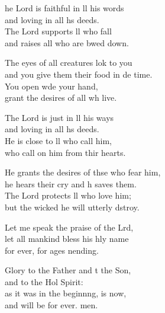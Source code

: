 \settowidth{\versewidth}{He grants the desires of those who fear him, *}
\begin{psalmverse}%
  \begin{patverse}
he Lord is faithful in ll his words\Med\\
and loving in all h\pointup{\i}s deeds.\\
The Lord supports ll who fall\Med\\
and raises all who are bwed down.

The eyes of all creatures lok to you\Med\\
and you give them their food in de time.\\
You open w\pointup{\i}de your hand,\Med\\
grant the desires of all wh live.

The Lord is just in ll his ways\Med\\
and loving in all h\pointup{\i}s deeds.\\
He is close to ll who call him,\Med\\
who call on him from thir hearts.

He grants the desires of thse who fear him,\Med\\
he hears their cry and h saves them.\\
The Lord protects ll who love him;\Med\\
but the wicked he will utterly dstroy.

Let me speak the praise of the Lrd,\Flex\\
let all mankind bless his hly name\Med\\
for ever, for ages nending.

Glory to the Father and t the Son,\Med\\
and to the Hol Spirit:\\
as it was in the beginn\pointup{\i}ng, is now,\Med\\
and will be for ever. men.
  \end{patverse}
\end{psalmverse}
